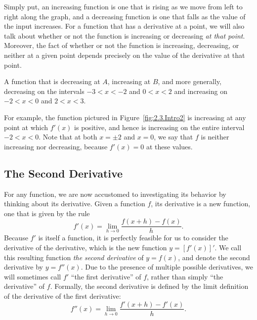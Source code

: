 Simply put, an increasing function is one that is rising as we move from left to right along the graph, and a decreasing function is one that falls as the value of the input increases.  For a function that has a derivative at a point, we will also talk about whether or not the function is increasing or decreasing \emph{at that point}.  Moreover, the fact of whether or not the function is increasing, decreasing, or neither at a given point depends precisely on the value of the derivative at that point.


\begin{marginfigure}[1cm] %
\caption{A function that is decreasing at $A$, increasing at $B$, and more generally, decreasing on the intervals $-3 < x < -2$ and $0 < x  < 2$ and increasing on $-2 < x < 0$ and $2 < x < 3$.} \label{fig:2.3.Intro2}
\end{marginfigure}

For example, the function pictured in Figure~\ref{fig:2.3.Intro2} is increasing at any point at which $f'(x)$ is positive, and hence is increasing on the entire interval $-2 < x < 0$.  Note that at both $x = \pm 2$ and $x = 0$, we say that $f$ is neither increasing nor decreasing, because $f'(x) = 0$ at these values.


\subsection*{The Second Derivative} 

For any function, we are now accustomed to investigating its behavior by thinking about its derivative.  Given a function $f$, its derivative is a new function, one that is given by the rule
\[ f'(x) = \lim_{h \to 0} \frac{f(x+h)-f(x)}{h}. \]
Because $f'$ is itself a function, it is perfectly feasible for us to consider the derivative of the derivative, which is the new function $y = [f'(x)]'$.  We call this resulting function \emph{the second derivative} of $y = f(x)$, and denote the second derivative by $y = f''(x)$.
Due to the presence of multiple possible derivatives, we will sometimes call $f'$ ``the first derivative'' of $f$, rather than simply ``the derivative'' of $f$. Formally, the second derivative is defined by the limit definition of the derivative of the first derivative:
\[ f''(x) = \lim_{h \to 0} \frac{f'(x+h)-f'(x)}{h}. \]


